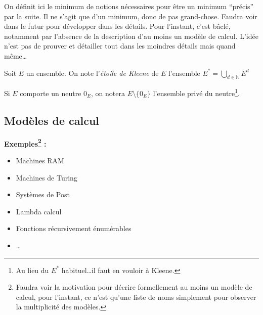 \documentclass[../../../main.tex]{subfiles}
\begin{document}
On définit ici le minimum de notions nécessaires pour être un minimum ``précis'' par la suite. Il ne s'agit que d'un minimum, donc de pas grand-chose. Faudra voir dans le futur pour développer dans les détails. Pour l'instant, c'est bâclé, notamment par l'absence de la description d'au moins un modèle de calcul. L'idée n'est pas de prouver et détailler tout dans les moindres détails mais quand même\dots

 {
	Soit $E$ un ensemble. On note l'\textit{étoile de Kleene} de $E$ l'ensemble $E^* = \displaystyle\bigcup_{d\in\mathbb{N}}E^d$

	Si $E$ comporte un neutre $0_E$, on notera $E\setminus \{0_E\}$ l'ensemble privé du neutre\footnote{Au lieu du $E^*$ habituel\dots il faut en vouloir à Kleene.}.
}
\subsection{Modèles de calcul}
\textbf{Exemples\footnote{Faudra voir la motivation pour décrire formellement au moins un modèle de calcul, pour l'instant, ce n'est qu'une liste de noms simplement pour observer la multiplicité des modèles.} :}
\begin{itemize}
	\item Machines RAM
	\item Machines de Turing
	\item Systèmes de Post
	\item Lambda calcul
	\item Fonctions récursivement énumérables
	\item \dots
\end{itemize}
\end{document}
